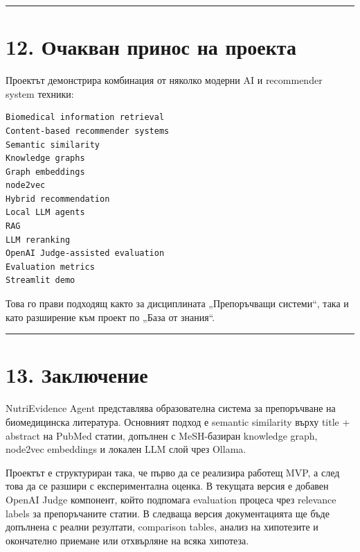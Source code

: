 \documentclass[12pt,a4paper]{article}
\begin{document}
\vspace{0.5em}\hrule\vspace{1.0em}

\section{12. Очакван принос на проекта}\label{ux43eux447ux430ux43aux432ux430ux43d-ux43fux440ux438ux43dux43eux441-ux43dux430-ux43fux440ux43eux435ux43aux442ux430}

Проектът демонстрира комбинация от няколко модерни AI и recommender system техники:

\begin{verbatim}
Biomedical information retrieval
Content-based recommender systems
Semantic similarity
Knowledge graphs
Graph embeddings
node2vec
Hybrid recommendation
Local LLM agents
RAG
LLM reranking
OpenAI Judge-assisted evaluation
Evaluation metrics
Streamlit demo
\end{verbatim}

Това го прави подходящ както за дисциплината „Препоръчващи системи``, така и като разширение към проект по „База от знания``.

\vspace{0.5em}\hrule\vspace{1.0em}

\section{13. Заключение}\label{ux437ux430ux43aux43bux44eux447ux435ux43dux438ux435}

NutriEvidence Agent представлява образователна система за препоръчване на биомедицинска литература. Основният подход е semantic similarity върху title + abstract на PubMed статии, допълнен с MeSH-базиран knowledge graph, node2vec embeddings и локален LLM слой чрез Ollama.

Проектът е структуриран така, че първо да се реализира работещ MVP, а след това да се разшири с експериментална оценка. В текущата версия е добавен OpenAI Judge компонент, който подпомага evaluation процеса чрез relevance labels за препоръчаните статии. В следваща версия документацията ще бъде допълнена с реални резултати, comparison tables, анализ на хипотезите и окончателно приемане или отхвърляне на всяка хипотеза.
\end{document}
